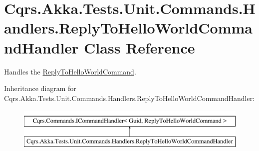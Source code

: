 \hypertarget{classCqrs_1_1Akka_1_1Tests_1_1Unit_1_1Commands_1_1Handlers_1_1ReplyToHelloWorldCommandHandler}{}\section{Cqrs.\+Akka.\+Tests.\+Unit.\+Commands.\+Handlers.\+Reply\+To\+Hello\+World\+Command\+Handler Class Reference}
\label{classCqrs_1_1Akka_1_1Tests_1_1Unit_1_1Commands_1_1Handlers_1_1ReplyToHelloWorldCommandHandler}


Handles the \hyperlink{classCqrs_1_1Akka_1_1Tests_1_1Unit_1_1Commands_1_1ReplyToHelloWorldCommand}{Reply\+To\+Hello\+World\+Command}.  


Inheritance diagram for Cqrs.\+Akka.\+Tests.\+Unit.\+Commands.\+Handlers.\+Reply\+To\+Hello\+World\+Command\+Handler\+:\begin{figure}[H]
\begin{center}
\leavevmode
\includegraphics[height=2.000000cm]{classCqrs_1_1Akka_1_1Tests_1_1Unit_1_1Commands_1_1Handlers_1_1ReplyToHelloWorldCommandHandler}
\end{center}
\end{figure}
